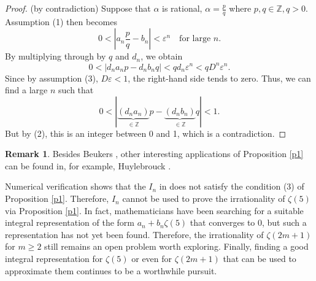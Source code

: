\documentclass[12pt,reqno]{amsart}
\theoremstyle{definition}
\newtheorem*{rmk}{Remark}
\numberwithin{equation}{section}
\begin{document}
\begin{proof} (by contradiction) Suppose that \(\alpha\) is rational, \(\alpha = \frac{p}{q}\) where \(p, q \in \mathbb{Z}, q > 0\). Assumption (1) then becomes
$$
0 < \left| a_n \frac{p}{q} - b_n \right| < \varepsilon^n \quad \text{for large } n
.$$ By multiplying through by \(q\) and \(d_n\), we obtain
$$
0 < \left| d_n a_n p - d_n b_n q \right| < q d_n \varepsilon^n < q D^n \varepsilon^n
.$$ Since by assumption (3), \(D \varepsilon < 1\), the right-hand side tends to zero. Thus, we can find a large \(n\) such that
$$
0 < \left| \underbrace{(d_n a_n)}_{\in \mathbb{Z}} p - \underbrace{(d_n b_n)}_{\in \mathbb{Z}} q \right| < 1
.$$ But by (2), this is an integer between 0 and 1, which is a contradiction.
\end{proof}

\begin{rmk}
    Besides Beukers \cite{Beukers1979}, other interesting applications of Proposition \ref{p1} can be found in, for example, Huylebrouck \cite{Huylebrouck2001}.
\end{rmk}


Numerical verification shows that the \(I_n\) in \cite[Lemma 1]{Suman2024} does not satisfy the condition (3) of Proposition \ref{p1}. Therefore, \(I_n\) cannot be used to prove the irrationality of \(\zeta(5)\) via Proposition \ref{p1}. In fact, mathematicians have been searching for a suitable integral representation of the form \(a_n + b_n \zeta(5)\) that converges to 0, but such a representation has not yet been found. Therefore, the irrationality of \(\zeta(2m+1)\) for \(m \geq 2\) still remains an open problem worth exploring. Finally, finding a good integral representation for \(\zeta(5)\) or even for \(\zeta(2m+1)\) that can be used to approximate them continues to be a worthwhile pursuit.



























 
\end{document}
